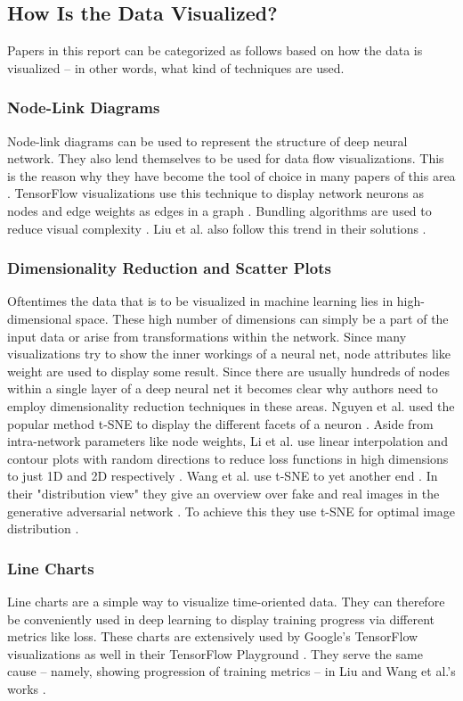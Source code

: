 \documentclass{acmsiggraph}               %
\begin{document}
\subsection{How Is the Data Visualized?}
Papers in this report can be categorized as follows based on how the data is visualized -- in other words, what kind of techniques are used.
\subsubsection{Node-Link Diagrams}
Node-link diagrams can be used to represent the structure of deep neural network. They also lend themselves to be used for data flow visualizations. This is the reason why they have become the tool of choice in many papers of this area \cite{Hohman2018}. TensorFlow visualizations use this technique to display network neurons as nodes and edge weights as edges in a graph \cite{Wongsuphasawat2018}. Bundling algorithms are used to reduce visual complexity \cite{Hohman2018,Wongsuphasawat2018}. Liu et al. also follow this trend in their solutions \cite{Liu2016,Liu2018}.
\subsubsection{Dimensionality Reduction and Scatter Plots}
Oftentimes the data that is to be visualized in machine learning lies in high-dimensional space. These high number of dimensions can simply be a part of the input data or arise from transformations within the network. Since many visualizations try to show the inner workings of a neural net, node attributes like weight are used to display some result. Since there are usually hundreds of nodes within a single layer of a deep neural net it becomes clear why authors need to employ dimensionality reduction techniques in these areas.
Nguyen et al. used the popular method t-SNE to display the different facets of a neuron \cite{Nguyen2016}. 
Aside from intra-network parameters like node weights, Li et al. use linear interpolation and contour plots with random directions to reduce loss functions in high dimensions to just 1D and 2D respectively \cite{Li2017}.
Wang et al. use t-SNE to yet another end \cite{Wang}. In their "distribution view" they give an overview over fake and real images in the generative adversarial network \cite{Wang}. To achieve this they use t-SNE for optimal image distribution \cite{Wang}. 
\subsubsection{Line Charts}
Line charts are a simple way to visualize time-oriented data. They can therefore be conveniently used in deep learning to display training progress via different metrics like loss. These charts are extensively used by Google's TensorFlow visualizations as well in their TensorFlow Playground \cite{Wongsuphasawat2018,Smilkov2017}.
They serve the same cause -- namely, showing progression of training metrics -- in Liu and Wang et al.'s works \cite{Liu2018,Wang}.
\end{document}
